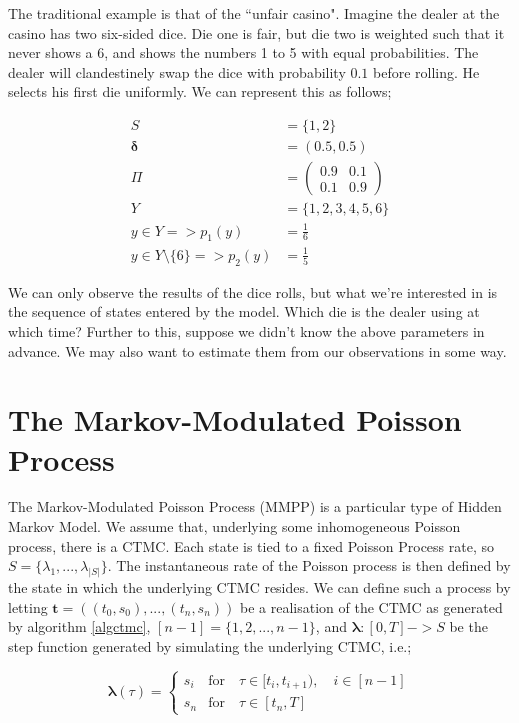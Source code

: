 The traditional example is that of the ``unfair casino". Imagine the dealer at the casino has two six-sided dice. Die one is fair, but die two is weighted such that it never shows a 6, and shows the numbers 1 to 5 with equal probabilities. The dealer will clandestinely swap the dice with probability $0.1$ before rolling. He selects his first die uniformly. We can represent this as follows;

\begin{align*}
S &= \{1,2\}\\
\bm{\delta} &= (0.5,0.5)\\
\Pi &= 
\left(
	\begin{matrix}
	0.9 & 0.1 \\
	0.1 & 0.9
	\end{matrix}
\right)\\
Y &= \{1,2,3,4,5,6\}\\
y \in Y => p_1(y) &= \frac{1}{6}\\
y \in Y \setminus \{6\} => p_2(y) &= \frac{1}{5}
\end{align*}

We can only observe the results of the dice rolls, but what we're interested in is the sequence of states entered by the model. Which die is the dealer using at which time? Further to this, suppose we didn't know the above parameters in advance. We may also want to estimate them from our observations in some way.

\section{The Markov-Modulated Poisson Process}\label{mmppdef}

The Markov-Modulated Poisson Process (MMPP) is a particular type of Hidden Markov Model. We assume that, underlying some inhomogeneous Poisson process, there is a CTMC. Each state is tied to a fixed Poisson Process rate, so $S = \{\lambda_1,...,\lambda_{|S|}\}$. The instantaneous rate of the Poisson process is then defined by the state in which the underlying CTMC resides. We can define such a process by letting $\mathbf{t} = ((t_0,s_0),...,(t_n,s_n))$ be a realisation of the CTMC as generated by algorithm \ref{algctmc}, $[n-1] = \{1,2,...,n-1\}$, and $\bm{\lambda} : [0,T]->S$ be the step function generated by simulating the underlying CTMC, i.e.;

$$
\bm{\lambda}(\tau) = 
\begin{cases}
	s_i & \mbox{for} \quad \tau \in [t_i,t_{i+1}), \quad i \in [n-1]\\
	s_n & \mbox{for} \quad \tau \in [t_n,T]
\end{cases}
$$


